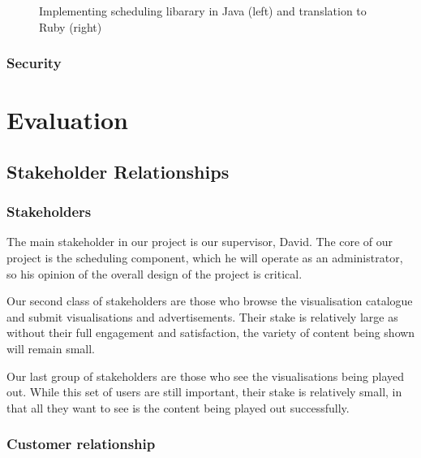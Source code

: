 \documentclass[a4paper, titlepage]{article}
\begin{document}
\begin{figure}[ht]
  \begin{minipage}{0.49\textwidth}
  \end{minipage}
  \begin{minipage}{0.49\textwidth}
  \end{minipage}
    
  \caption{Implementing scheduling libarary in Java (left) and translation to Ruby (right)}
  \label{fig:impl_translation}
\end{figure}


\subsubsection{Security}



\newpage
\section{Evaluation}

\subsection{Stakeholder Relationships}

\subsubsection{Stakeholders}

The main stakeholder in our project is our supervisor, David. The core of our project is the scheduling component, which he will operate as an administrator, so his opinion of the overall design of the project is critical.

Our second class of stakeholders are those who browse the visualisation catalogue and submit visualisations and advertisements. Their stake is relatively large as without their full engagement and satisfaction, the variety of content being shown will remain small. 

Our last group of stakeholders are those who see the visualisations being played out. While this set of users are still important, their stake is relatively small, in that all they want to see is the content being played out successfully.

\subsubsection{Customer relationship}
\end{document}
